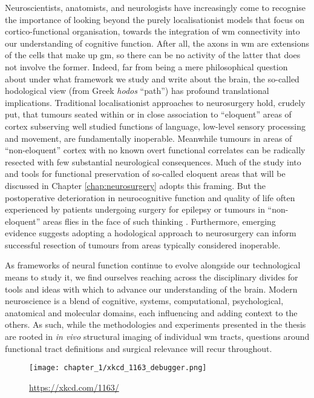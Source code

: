 Neuroscientists, anatomists, and neurologists have increasingly come to recognise the importance of looking beyond the purely localisationist models that focus on cortico-functional organisation, towards the integration of \gls{wm} connectivity into our understanding of cognitive function\autocite{ffytche2005,Catani2007}.
After all, the axons in \gls{wm} are extensions of the cells that make up \gls{gm}, so there can be no activity of the latter that does not involve the former.
Indeed, far from being a mere philosophical question about under what framework we study and write about the brain, the so-called hodological view (from Greek \textit{hodos} ``path'') has profound translational implications.
Traditional localisationist approaches to neurosurgery hold, crudely put, that tumours seated within or in close association to ``eloquent'' areas of cortex subserving well studied functions of language, low-level sensory processing and movement, are fundamentally inoperable.
Meanwhile tumours in areas of ``non-eloquent'' cortex with no known overt functional correlates can be radically resected with few substantial neurological consequences.
Much of the study into and tools for functional preservation of so-called eloquent areas that will be discussed in Chapter \ref{chap:neurosurgery} adopts this framing.
But the postoperative deterioration in neurocognitive function and quality of life often experienced by patients undergoing surgery for epilepsy or tumours in ``non-eloquent'' areas flies in the face of such thinking
\autocite{Satoer2017,Mandonnet2017a,Rijnen2019,Herbet2019,Vigren2020a,Dadario2021}.
Furthermore, emerging evidence suggests adopting a hodological approach to neurosurgery can inform successful resection of tumours from areas typically considered inoperable\autocite{Dadario2021,DeBenedictis2011b,Suzuki2023}.

As frameworks of neural function continue to evolve alongside our technological means to study it, we find ourselves reaching across the disciplinary divides for tools and ideas with which to advance our understanding of the brain.
Modern neuroscience is a blend of cognitive, systems, computational, psychological, anatomical and molecular domains, each influencing and adding context to the others.
As such, while the methodologies and experiments presented in the thesis are rooted in \textit{in vivo} structural imaging of individual \gls{wm} tracts, questions around functional tract definitions and surgical relevance will recur throughout.

\begin{figure}[hb!]
  \centering
  \texttt{[image: chapter\_1/xkcd\_1163\_debugger.png]}
  \caption*{\href{xkcd \#1163: ``Debugger''}{https://xkcd.com/1163/}}
  \label{fig:xkcd}
\end{figure}

